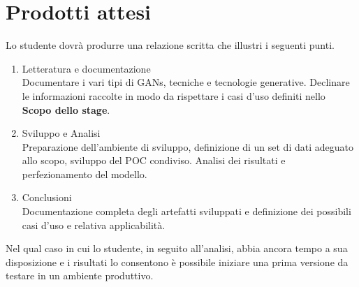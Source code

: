 \section*{Prodotti attesi}
Lo studente dovrà produrre una relazione scritta che illustri i seguenti punti.
\begin{enumerate}
    \item Letteratura e documentazione \\
    Documentare i vari tipi di GANs, tecniche e tecnologie generative. Declinare le informazioni raccolte in modo da rispettare i casi d'uso definiti nello {\bf Scopo dello stage}.  
    
    \item Sviluppo e Analisi \\
    Preparazione dell'ambiente di sviluppo, definizione di un set di dati adeguato allo scopo, sviluppo del POC condiviso.
Analisi dei risultati e perfezionamento del modello.
    
    \item Conclusioni \\
    Documentazione completa degli artefatti sviluppati e definizione dei possibili casi d'uso e relativa applicabilità.
\end{enumerate}

Nel qual caso in cui lo studente, in seguito all'analisi, abbia ancora tempo a sua disposizione e i risultati lo consentono è possibile iniziare una prima versione da testare in un ambiente produttivo.
